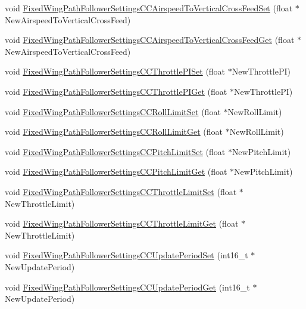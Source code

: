 \begin{DoxyCompactItemize}
\item 
void \hyperlink{group___fixed_wing_path_follower_settings_c_c_gafa318295a8a434a1931efd497369af32}{\-Fixed\-Wing\-Path\-Follower\-Settings\-C\-C\-Airspeed\-To\-Vertical\-Cross\-Feed\-Set} (float $\ast$\-New\-Airspeed\-To\-Vertical\-Cross\-Feed)
\item 
void \hyperlink{group___fixed_wing_path_follower_settings_c_c_gad03454b9c82e00364106e005a44f8174}{\-Fixed\-Wing\-Path\-Follower\-Settings\-C\-C\-Airspeed\-To\-Vertical\-Cross\-Feed\-Get} (float $\ast$\-New\-Airspeed\-To\-Vertical\-Cross\-Feed)
\item 
void \hyperlink{group___fixed_wing_path_follower_settings_c_c_ga814f020a3704995f2488a52b4d7024c2}{\-Fixed\-Wing\-Path\-Follower\-Settings\-C\-C\-Throttle\-P\-I\-Set} (float $\ast$\-New\-Throttle\-P\-I)
\item 
void \hyperlink{group___fixed_wing_path_follower_settings_c_c_ga8df0ed5ee611b9e7c75c9a490c62d8d7}{\-Fixed\-Wing\-Path\-Follower\-Settings\-C\-C\-Throttle\-P\-I\-Get} (float $\ast$\-New\-Throttle\-P\-I)
\item 
void \hyperlink{group___fixed_wing_path_follower_settings_c_c_ga8fd282dd33a3a7c951575e03e3bc42ce}{\-Fixed\-Wing\-Path\-Follower\-Settings\-C\-C\-Roll\-Limit\-Set} (float $\ast$\-New\-Roll\-Limit)
\item 
void \hyperlink{group___fixed_wing_path_follower_settings_c_c_gadc322abc1dff25142363278b15072889}{\-Fixed\-Wing\-Path\-Follower\-Settings\-C\-C\-Roll\-Limit\-Get} (float $\ast$\-New\-Roll\-Limit)
\item 
void \hyperlink{group___fixed_wing_path_follower_settings_c_c_gafdd489bb4836f497f447fed33ed37619}{\-Fixed\-Wing\-Path\-Follower\-Settings\-C\-C\-Pitch\-Limit\-Set} (float $\ast$\-New\-Pitch\-Limit)
\item 
void \hyperlink{group___fixed_wing_path_follower_settings_c_c_ga413028d6fc7fa066687167b673efc44c}{\-Fixed\-Wing\-Path\-Follower\-Settings\-C\-C\-Pitch\-Limit\-Get} (float $\ast$\-New\-Pitch\-Limit)
\item 
void \hyperlink{group___fixed_wing_path_follower_settings_c_c_ga98bf2560422b99f11417d54a37e58320}{\-Fixed\-Wing\-Path\-Follower\-Settings\-C\-C\-Throttle\-Limit\-Set} (float $\ast$\-New\-Throttle\-Limit)
\item 
void \hyperlink{group___fixed_wing_path_follower_settings_c_c_gaa3f7f49dab7acf1a3d5660c62e398bfa}{\-Fixed\-Wing\-Path\-Follower\-Settings\-C\-C\-Throttle\-Limit\-Get} (float $\ast$\-New\-Throttle\-Limit)
\item 
void \hyperlink{group___fixed_wing_path_follower_settings_c_c_gaecc75ffc1815a5371e26a0283bf4ea85}{\-Fixed\-Wing\-Path\-Follower\-Settings\-C\-C\-Update\-Period\-Set} (int16\-\_\-t $\ast$\-New\-Update\-Period)
\item 
void \hyperlink{group___fixed_wing_path_follower_settings_c_c_gafbec2a8a5b73865bf9b27bbad6c9d369}{\-Fixed\-Wing\-Path\-Follower\-Settings\-C\-C\-Update\-Period\-Get} (int16\-\_\-t $\ast$\-New\-Update\-Period)
\end{DoxyCompactItemize}


